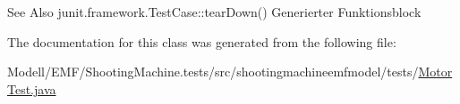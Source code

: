 \begin{DoxySeeAlso}{See Also}
junit.\-framework.\-Test\-Case\-::tear\-Down() Generierter Funktionsblock 
\end{DoxySeeAlso}


The documentation for this class was generated from the following file\-:\begin{DoxyCompactItemize}
\item 
Modell/\-E\-M\-F/\-Shooting\-Machine.\-tests/src/shootingmachineemfmodel/tests/\hyperlink{_motor_test_8java}{Motor\-Test.\-java}\end{DoxyCompactItemize}
